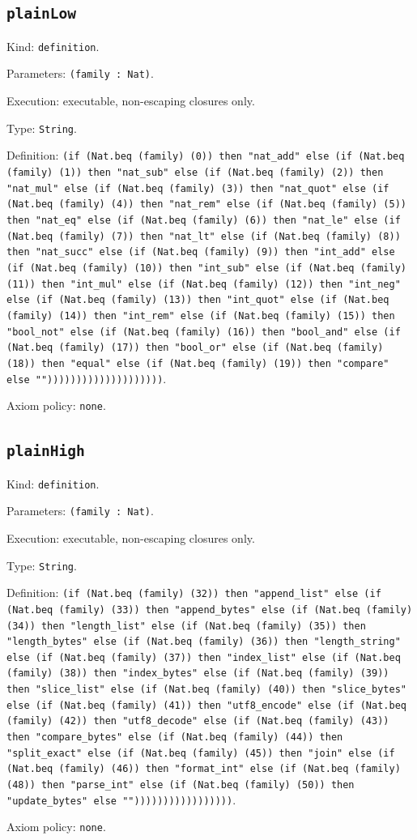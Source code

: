 \documentclass[11pt]{article}
\begin{document}
\subsection*{\texttt{plainLow}}
\noindent Kind: \texttt{definition}.\par
\noindent Parameters: \texttt{(family : Nat)}.\par
\noindent Execution: executable, non-escaping closures only.\par
\noindent Type: \texttt{String}.\par
\noindent Definition: \texttt{(if (Nat.beq (family) (0)) then "nat\_add" else (if (Nat.beq (family) (1)) then "nat\_sub" else (if (Nat.beq (family) (2)) then "nat\_mul" else (if (Nat.beq (family) (3)) then "nat\_quot" else (if (Nat.beq (family) (4)) then "nat\_rem" else (if (Nat.beq (family) (5)) then "nat\_eq" else (if (Nat.beq (family) (6)) then "nat\_le" else (if (Nat.beq (family) (7)) then "nat\_lt" else (if (Nat.beq (family) (8)) then "nat\_succ" else (if (Nat.beq (family) (9)) then "int\_add" else (if (Nat.beq (family) (10)) then "int\_sub" else (if (Nat.beq (family) (11)) then "int\_mul" else (if (Nat.beq (family) (12)) then "int\_neg" else (if (Nat.beq (family) (13)) then "int\_quot" else (if (Nat.beq (family) (14)) then "int\_rem" else (if (Nat.beq (family) (15)) then "bool\_not" else (if (Nat.beq (family) (16)) then "bool\_and" else (if (Nat.beq (family) (17)) then "bool\_or" else (if (Nat.beq (family) (18)) then "equal" else (if (Nat.beq (family) (19)) then "compare" else ""))))))))))))))))))))}.\par
\noindent Axiom policy: \texttt{none}.\par
\subsection*{\texttt{plainHigh}}
\noindent Kind: \texttt{definition}.\par
\noindent Parameters: \texttt{(family : Nat)}.\par
\noindent Execution: executable, non-escaping closures only.\par
\noindent Type: \texttt{String}.\par
\noindent Definition: \texttt{(if (Nat.beq (family) (32)) then "append\_list" else (if (Nat.beq (family) (33)) then "append\_bytes" else (if (Nat.beq (family) (34)) then "length\_list" else (if (Nat.beq (family) (35)) then "length\_bytes" else (if (Nat.beq (family) (36)) then "length\_string" else (if (Nat.beq (family) (37)) then "index\_list" else (if (Nat.beq (family) (38)) then "index\_bytes" else (if (Nat.beq (family) (39)) then "slice\_list" else (if (Nat.beq (family) (40)) then "slice\_bytes" else (if (Nat.beq (family) (41)) then "utf8\_encode" else (if (Nat.beq (family) (42)) then "utf8\_decode" else (if (Nat.beq (family) (43)) then "compare\_bytes" else (if (Nat.beq (family) (44)) then "split\_exact" else (if (Nat.beq (family) (45)) then "join" else (if (Nat.beq (family) (46)) then "format\_int" else (if (Nat.beq (family) (48)) then "parse\_int" else (if (Nat.beq (family) (50)) then "update\_bytes" else "")))))))))))))))))}.\par
\noindent Axiom policy: \texttt{none}.\par
\end{document}
